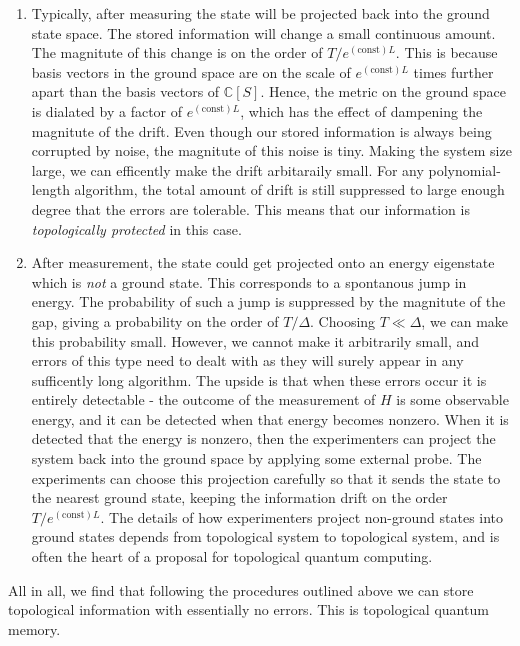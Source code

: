 \documentclass{article}
\theoremstyle{definition}
\newcommand{\CC}{\mathbb{C}}
\newcommand{\0}{\left|0\right>}
\newcommand{\1}{\left|1\right>}
\numberwithin{figure}{section}
\begin{document}
\begin{enumerate}
\item Typically, after measuring the state will be projected back into the ground state space. The stored information will change a small continuous amount. The magnitute of this change is on the order of $T/e^{(\text{const})L}$. This is because basis vectors in the ground space are on the scale of $e^{(\text{const})L}$ times further apart than the basis vectors of $\CC[S]$. Hence, the metric on the ground space is dialated by a factor of $e^{(\text{const})L}$, which has the effect of dampening the magnitute of the drift. Even though our stored information is always being corrupted by noise, the magnitute of this noise is tiny. Making the system size large, we can efficently make the drift arbitaraily small. For any polynomial-length algorithm, the total amount of drift is still suppressed to large enough degree that the errors are tolerable. This means that our information is \textit{topologically protected} in this case.

\item After measurement, the state could get projected onto an energy eigenstate which is \textit{not} a ground state. This corresponds to a spontanous jump in energy. The probability of such a jump is suppressed by the magnitute of the gap, giving a probability on the order of $T/\Delta$. Choosing $T\ll \Delta$, we can make this probability small. However, we cannot make it arbitrarily small, and errors of this type need to dealt with as they will surely appear in any sufficently long algorithm. The upside is that when these errors occur it is entirely detectable - the outcome of the measurement of $H$ is some observable energy, and it can be detected when that energy becomes nonzero. When it is detected that the energy is nonzero, then the experimenters can project the system back into the ground space by applying some external probe. The experiments can choose this projection carefully so that it sends the state to the nearest ground state, keeping the information drift on the order $T/e^{(\text{const})L}$. The details of how experimenters project non-ground states into ground states depends from topological system to topological system, and is often the heart of a proposal for topological quantum computing.
\end{enumerate}

All in all, we find that following the procedures outlined above we can store topological information with essentially no errors. This is topological quantum memory.
\end{document}
